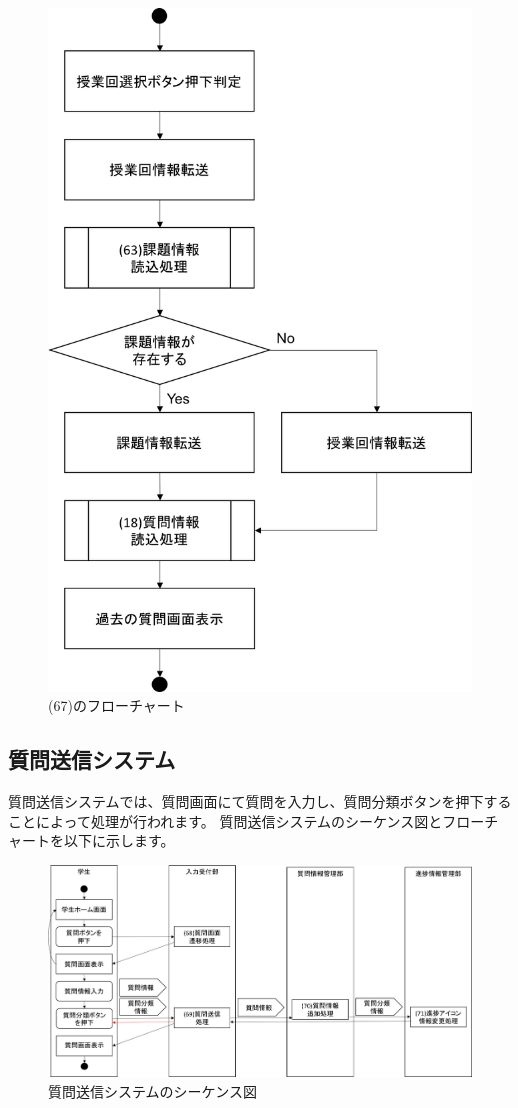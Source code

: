 \begin{figure}[htbp]
\begin{center}
 \includegraphics[width=0.5\linewidth,clip]{./img/flow/67.png}
\end{center}
 \caption{(67)のフローチャート}\label{fig:67}
\end{figure}

\clearpage




\subsection{質問送信システム}
質問送信システムでは、質問画面にて質問を入力し、質問分類ボタンを押下することによって処理が行われます。
質問送信システムのシーケンス図とフローチャートを以下に示します。

\begin{figure}[htbp]
  \begin{center}
    \includegraphics[width=1\linewidth,clip]{./img/seq18.png}
    \caption{質問送信システムのシーケンス図}\label{fig:seq18}
  \end{center}
\end{figure}

